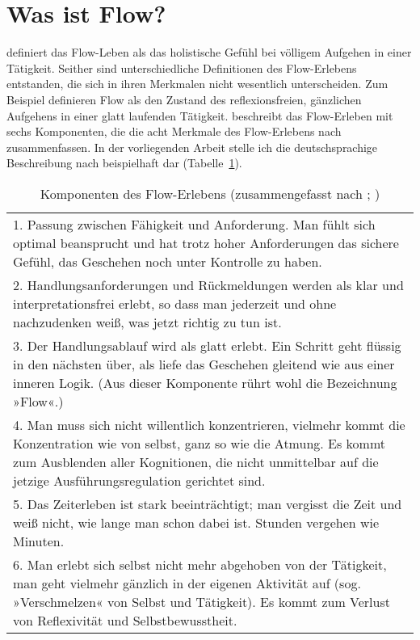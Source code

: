 

\section{Was ist Flow?} 

\label{sec:was_ist_flow}

\citet[S.~58f.]{Csikszentmihalyi2010} definiert das Flow-Leben als das holistische Gefühl bei völligem Aufgehen in einer Tätigkeit. Seither sind unterschiedliche Definitionen des Flow-Erlebens entstanden, die sich in ihren Merkmalen nicht wesentlich unterscheiden. Zum Beispiel definieren \citet[][S.~263]{Rheinberg2003} Flow als den Zustand des reflexionsfreien, gänzlichen Aufgehens in einer glatt laufenden Tätigkeit. \citep[S.~153ff.]{Rheinberg2008} beschreibt das Flow-Erleben mit sechs Komponenten, die die acht Merkmale des Flow-Erlebens nach \citet[S.~108ff.]{Csikszentmihalyi2010} zusammenfassen. In der vorliegenden Arbeit stelle ich die deutschsprachige Beschreibung nach \citep[]{Rheinberg2008} beispielhaft dar (Tabelle~\ref{tab:komponenten_des_flow_erlebens}). 
\begin{table}
	[h] \caption[Komponenten des Flow-Erlebens]{Komponenten des Flow-Erlebens (zusammengefasst nach \citet{Csikszentmihalyi2010}; \citep[S.~153ff.]{Rheinberg2008})} \label{tab:komponenten_des_flow_erlebens} 
	\begin{tabularx}
		{
		\textwidth}{X} \midrule 1. Passung zwischen Fähigkeit und Anforderung. Man fühlt sich optimal beansprucht und hat trotz hoher Anforderungen das sichere Gefühl, das Geschehen noch unter Kontrolle zu haben. \\
		2. Handlungsanforderungen und Rückmeldungen werden als klar und interpretationsfrei erlebt, so dass man jederzeit und ohne nachzudenken weiß, was jetzt richtig zu tun ist. \\
		3. Der Handlungsablauf wird als glatt erlebt. Ein Schritt geht flüssig in den nächsten über, als liefe das Geschehen gleitend wie aus einer inneren Logik. (Aus dieser Komponente rührt wohl die Bezeichnung »Flow«.) \\
		4. Man muss sich nicht willentlich konzentrieren, vielmehr kommt die Konzentration wie von selbst, ganz so wie die Atmung. Es kommt zum Ausblenden aller Kognitionen, die nicht unmittelbar auf die jetzige Ausführungsregulation gerichtet sind. \\
		5. Das Zeiterleben ist stark beeinträchtigt; man vergisst die Zeit und weiß nicht, wie lange man schon dabei ist. Stunden vergehen wie Minuten. \\
		6. Man erlebt sich selbst nicht mehr abgehoben von der Tätigkeit, man geht vielmehr gänzlich in der eigenen Aktivität auf (sog. »Verschmelzen« von Selbst und Tätigkeit). Es kommt zum Verlust von Reflexivität und Selbstbewusstheit. \\
		\bottomrule 
	\end{tabularx}
\end{table}
